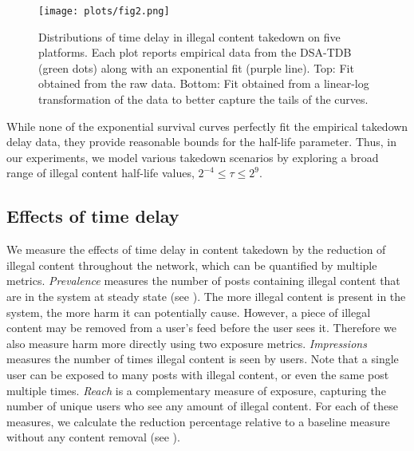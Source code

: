 \documentclass{article}
\begin{document}
\begin{figure}
\centering
\texttt{[image: plots/fig2.png]}
\caption{
Distributions of time delay in illegal content takedown on five platforms. Each plot reports empirical data from the DSA-TDB (green dots) along with an exponential fit (purple line). Top: Fit obtained from the raw data. Bottom: Fit obtained from a linear-log transformation of the data to better capture the tails of the curves. 
}
\label{fig:timedelay_curve}
\end{figure}

While none of the exponential survival curves perfectly fit the empirical takedown delay data, they provide reasonable bounds for the half-life parameter. Thus, in our experiments, we model various takedown scenarios by exploring a broad range of illegal content half-life values, $2^{-4} \leq \tau \leq 2^9$. 

\subsection*{Effects of time delay} 
\label{sec:main_results}

We measure the effects of time delay in content takedown by the reduction of illegal content throughout the network, which can be quantified by multiple metrics. 
\textit{Prevalence} measures the number of posts containing illegal content that are in the system at steady state (see ). The more illegal content is present in the system, the more harm it can potentially cause. 
However, a piece of illegal content may be removed from a user's feed before the user sees it. Therefore we also measure harm more directly using two exposure metrics. 
\textit{Impressions} measures the number of times illegal content is seen by users. Note that a single user can be exposed to many posts with illegal content, or even the same post multiple times. 
\textit{Reach} is a complementary measure of exposure, capturing the number of unique users who see any amount of illegal content. 
For each of these measures, we calculate the reduction percentage relative to a baseline measure without any content removal (see ). 
\end{document}

